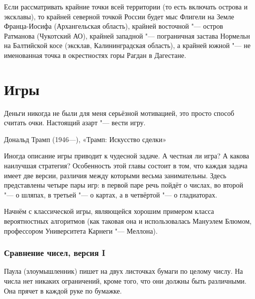 \documentclass[twoside]{book}
\makeatletter
\newcommand{\rindex}[2][\imki@jobname]{%
  \index[#1]{\detokenize{#2}}%
}
\makeatother
\begin{document}
Если рассматривать крайние точки всей территории (то есть включать острова и эксклавы), то крайней северной
точкой России будет мыс Флигели на Земле Франца-Иосифа (Архангельская область), крайней восточной "--- остров Ратманова (Чукотский АО), 
крайней западной "--- пограничная застава Нормельн на Балтийской косе (эксклав, Калининградская область), 
а крайней южной "--- не именованная точка в окрестностях горы Рагдан в Дагестане. 






\chapter{Игры}

\setlength{\epigraphwidth}{.66\textwidth}
\epigraph{Деньги никогда не были для меня серьёзной мотивацией, это просто способ считать очки.
Настоящий азарт "--- вести игру.\vspace{1ex}}{Дональд Трамп (1946---),
«Трамп: Искусство сделки»}

Иногда  описание игры приводит к чудесной задаче.
А честная ли игра? А какова наилучшая стратегия? Особенность этой главы состоит в том, что каждая задача имеет две версии, различия между которыми весьма занимательны.
Здесь представлены четыре пары игр: в первой паре речь пойдёт о числах, во второй "--- о шляпах, в третьей "--- о картах, а в четвёртой "--- о гладиаторах.

\medskip

Начнём с классической игры, являющейся  хорошим примером класса вероятностных алгоритмов (как таковая она и использовалась Мануэлем Блюмом,  профессором Университета Карнеги "--- Меллона). %

\subsection*{Сравнение чисел, версия I} %
\rindex{Сравнение чисел, версия I}

Паула (злоумышленник) пишет на двух листочках бумаги по целому числу.
На числа нет никаких ограничений, кроме того, что они должны быть различными.
Она прячет в каждой руке по бумажке.
\end{document}
